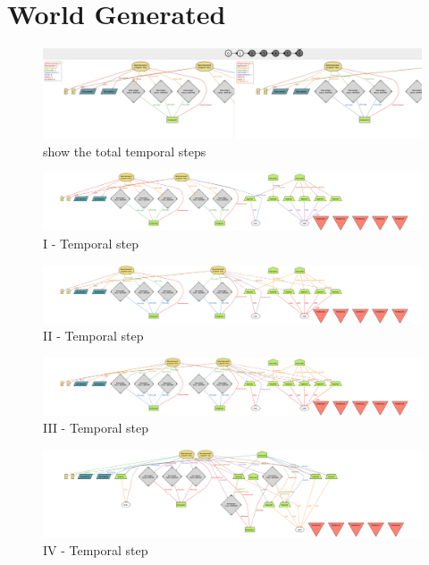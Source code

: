 \section{World Generated}
 
 
\begin{figure}[H]
    \centering
    \includegraphics[width=450px]{../../assets/alloy-world/world_steps.png}
    \caption{show the total temporal steps}
\end{figure}

\begin{figure}[H]
    \centering
    \includegraphics[width=450px]{../../assets/alloy-world/I_step.png}
    \caption{I - Temporal step}
\end{figure}

\begin{figure}[H]
    \centering
    \includegraphics[width=450px]{../../assets/alloy-world/II_step.png}
     \caption{II - Temporal step}
\end{figure}


\begin{figure}[H]
    \centering
    \includegraphics[width=450px]{../../assets/alloy-world/III_step.png}
    \caption{III - Temporal step}
\end{figure}

\begin{figure}[H]
    \centering
    \includegraphics[width=450px]{../../assets/alloy-world/IV_step.png}
    \caption{IV - Temporal step}
\end{figure}

